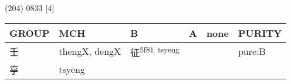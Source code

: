 \documentclass[14pt,a4paper]{scrartcl}
\begin{document}
(204) 0833 {[}4{]}

\begin{longtable}[c]{@{}llllll@{}}
\toprule
\begin{minipage}[b]{0.14\columnwidth}\raggedright\strut
GROUP
\strut\end{minipage} &
\begin{minipage}[b]{0.14\columnwidth}\raggedright\strut
MCH
\strut\end{minipage} &
\begin{minipage}[b]{0.14\columnwidth}\raggedright\strut
B
\strut\end{minipage} &
\begin{minipage}[b]{0.14\columnwidth}\raggedright\strut
A
\strut\end{minipage} &
\begin{minipage}[b]{0.14\columnwidth}\raggedright\strut
none
\strut\end{minipage} &
\begin{minipage}[b]{0.14\columnwidth}\raggedright\strut
PURITY
\strut\end{minipage}\tabularnewline
\midrule
\endhead
\begin{minipage}[t]{0.14\columnwidth}\raggedright\strut
壬
\strut\end{minipage} &
\begin{minipage}[t]{0.14\columnwidth}\raggedright\strut
thengX, dengX
\strut\end{minipage} &
\begin{minipage}[t]{0.14\columnwidth}\raggedright\strut
征\textsuperscript{5f81~tsyeng}
\strut\end{minipage} &
\begin{minipage}[t]{0.14\columnwidth}\raggedright\strut
\strut\end{minipage} &
\begin{minipage}[t]{0.14\columnwidth}\raggedright\strut
\strut\end{minipage} &
\begin{minipage}[t]{0.14\columnwidth}\raggedright\strut
pure:B
\strut\end{minipage}\tabularnewline
\begin{minipage}[t]{0.14\columnwidth}\raggedright\strut
亭
\strut\end{minipage} &
\begin{minipage}[t]{0.14\columnwidth}\raggedright\strut
tsyeng
\strut\end{minipage} &
\begin{minipage}[t]{0.14\columnwidth}\raggedright\strut

\end{minipage}
\end{longtable}
\end{document}
